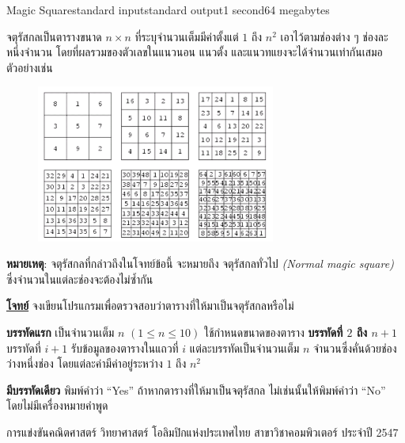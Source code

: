 \documentclass[11pt,a4paper]{article}
\begin{document}
\begin{problem}{Magic Square}{standard input}{standard output}{1 second}{64 megabytes}

จตุรัสกลเป็นตารางขนาด $n \times n$ ที่ระบุจำนวนเต็มมีค่าตั้งแต่ $1$ ถึง $n^2$ เอาไว้ตามช่องต่าง ๆ ช่องละหนึ่งจำนวน โดยที่ผลรวมของตัวเลขในแนวนอน แนวตั้ง และแนวทแยงจะได้จำนวนเท่ากันเสมอ ตัวอย่างเช่น

\begin{figure}[h]
\centering
\includegraphics[width=0.7\textwidth]{../latex/img/1017/1017-1.png}
\end{figure}

\textbf{หมายเหตุ}: จตุรัสกลที่กล่าวถึงในโจทย์ข้อนี้ จะหมายถึง จตุรัสกลทั่วไป \textit{(Normal magic square)} ซึ่งจำนวนในแต่ละช่องจะต้องไม่ซ้ำกัน
\bigskip

\underline{\textbf{โจทย์}} จงเขียนโปรแกรมเพื่อตรวจสอบว่าตารางที่ให้มาเป็นจตุรัสกลหรือไม่

\InputFile

\textbf{บรรทัดแรก} เป็นจำนวนเต็ม $n$ $(1 \leq n \leq 10)$ ใช้กำหนดขนาดของตาราง
\textbf{บรรทัดที่ $2$ ถึง $n+1$} บรรทัดที่ $i+1$ รับข้อมูลของตารางในแถวที่ $i$ แต่ละบรรทัดเป็นจำนวนเต็ม $n$ จำนวนซึ่งคั่นด้วยช่องว่างหนึ่งช่อง โดยแต่ละค่ามีค่าอยู่ระหว่าง $1$ ถึง $n^2$

\OutputFile

\textbf{มีบรรทัดเดียว} พิมพ์คำว่า “Yes” ถ้าหากตารางที่ให้มาเป็นจตุรัสกล ไม่เช่นนั้นให้พิมพ์คำว่า “No” โดยไม่มีเครื่องหมายคำพูด

\Examples

\begin{example}
%
\end{example}


\Source

การแข่งขันคณิตศาสตร์ วิทยาศาสตร์ โอลิมปิกแห่งประเทศไทย สาขาวิชาคอมพิวเตอร์ ประจำปี 2547

\end{problem}
\end{document}
